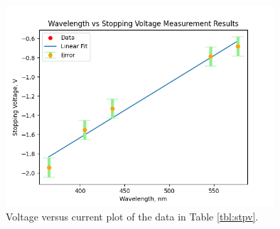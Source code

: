 	
		\begin{figure}[H]
			\centering
			\includegraphics[width=10cm]{images/plot2_pe.png}
			\caption{Voltage versus current plot of the data in Table \ref{tbl:stpv}.}
			\label{fig:plt2}
		\end{figure}
	